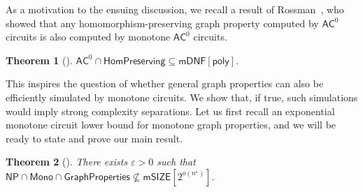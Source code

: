 \documentclass[10pt,a4paper]{article}
\newtheorem{theorem}{Theorem}[section]
\newcommand{\eps}{\varepsilon}
\newcommand{\poly}{\mathsf{poly}}
\newcommand{\complexityfont}[1]{\mathsf{#1}}
\newcommand{\monclass}[1]{\mathsf{m}#1}
\def\NP           {\complexityfont{NP}}
\def\AC           {\complexityfont{AC}}
\def\SIZE         {\complexityfont{SIZE}}
\def\mSIZE        {\monclass{\SIZE}}
\newcommand{\semMon}[1]{#1 \cap \monfns}
\newcommand{\monfns}{\mathsf{Mono}}
\newcommand{\GraphPpts}{\mathsf{GraphProperties}}
\newcommand{\HomPres}{\mathsf{HomPreserving}}
\newcommand{\mDNF}{\monclass{\DNF}}
\newcommand{\DNF}{\mathsf{DNF}}
\def\sseq{\subseteq}
\begin{document}
As a motivation to 
the ensuing discussion,
we recall a result of
Rossman~\cite{rossman_2008},
who 
showed that any homomorphism-preserving
graph property computed by \(\AC^0\) circuits is also computed
by monotone \(\AC^0\) circuits.

\begin{theorem}[\cite{rossman_2008}]
    \label{t:ros08}
    $\AC^0
    \cap 
    \HomPres 
    \sseq \mDNF[\poly]$.
\end{theorem}

This inspires the question of whether general graph properties
can also be efficiently simulated by monotone circuits.
We show that, if true,
such simulations would imply strong complexity separations.
Let us first recall an exponential monotone circuit lower bound for
monotone graph properties, and we will be ready to state and prove our main
result.


\begin{theorem}[\cite{DBLP:journals/combinatorica/AlonB87}]
    \label{thm:ab-graph}
    There exists $\eps > 0$
    such that
    $\semMon{\NP} \cap \GraphPpts \not\sseq \mSIZE[2^{o(n^\eps)}]$.
\end{theorem}
\end{document}

